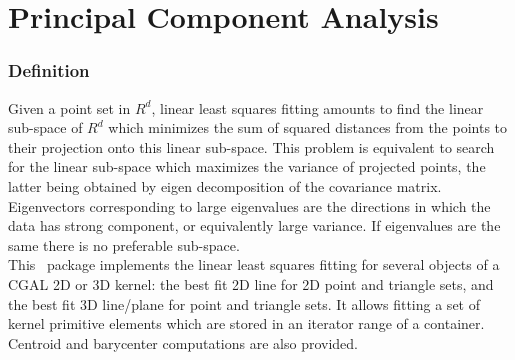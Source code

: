 
\chapter{Principal Component Analysis}
\label{ref_chapter_pca}


\subsection*{Definition}

Given a point set in $R^d$, linear least squares fitting amounts to
find the linear sub-space of $R^d$ which minimizes the sum of squared
distances from the points to their projection onto this linear
sub-space. This problem is equivalent to search for the linear
sub-space which maximizes the variance of projected points, the latter
being obtained by eigen decomposition of the covariance
matrix. Eigenvectors corresponding to large eigenvalues are the
directions in which the data has strong component, or equivalently
large variance. If eigenvalues are the same there is no preferable
sub-space.\\

This \cgal\ package implements the linear least squares fitting for
several objects of a CGAL 2D or 3D kernel: the best fit 2D line for 2D
point and triangle sets, and the best fit 3D line/plane for point and
triangle sets.
It allows fitting a set of kernel primitive elements
which are stored in an iterator range of a container.
Centroid and barycenter computations are also provided.



\\
\\
\\
\clearpage

